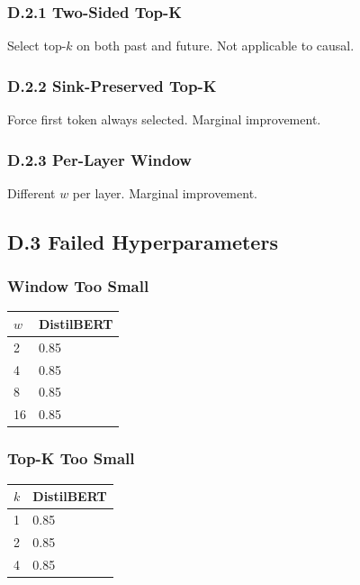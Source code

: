 \subsubsection{D.2.1 Two-Sided Top-K}

Select top-$k$ on both past and future. Not applicable to causal.

\subsubsection{D.2.2 Sink-Preserved Top-K}

Force first token always selected. Marginal improvement.

\subsubsection{D.2.3 Per-Layer Window}

Different $w$ per layer. Marginal improvement.

\subsection{D.3 Failed Hyperparameters}

\subsubsection{Window Too Small}

\begin{table}[H]
\centering
\small
\begin{tabular}{ll}
\toprule
\textbf{$w$} & \textbf{DistilBERT} \\
\midrule
2 & 0.85 \\
4 & 0.85 \\
8 & 0.85 \\
16 & 0.85 \\
\bottomrule
\end{tabular}
\end{table}

\subsubsection{Top-K Too Small}

\begin{table}[H]
\centering
\small
\begin{tabular}{ll}
\toprule
\textbf{$k$} & \textbf{DistilBERT} \\
\midrule
1 & 0.85 \\
2 & 0.85 \\
4 & 0.85 \\
\bottomrule
\end{tabular}
\end{table}

